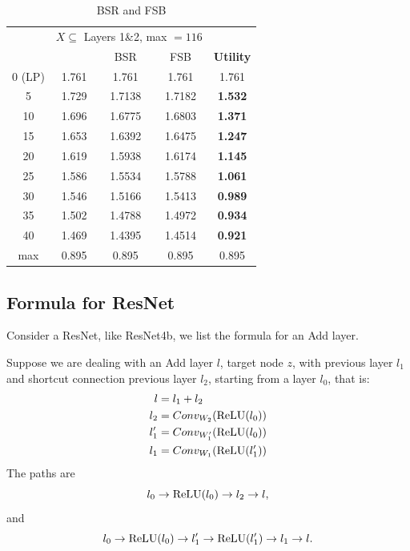 \begin{table}[h!]	
	\centering
	\begin{tabular}{|c||c|c|c|c|}
		\hline
		&\multicolumn{3}{c|}{$X \subseteq$ Layers 1\&2, max $=116$}\\\cline{2-5}
		\text{$|X|$} & \text{Random} &BSR &FSB &\bf Utility\\ \hline
		0  (LP) & 1.761  &  1.761& 1.761&1.761\\ \hline \hline
		5  & 1.729& 1.7138 & 1.7182 &\bf 1.532 \\ \hline
		10  & 1.696 & 1.6775&  1.6803&\bf  1.371\\ \hline
		15  &   1.653& 1.6392& 1.6475&\bf  1.247\\ \hline
		20  &   1.619 &1.5938 & 1.6174&\bf  1.145\\ \hline
		25  &    1.586 &1.5534 &1.5788 &\bf 1.061\\ \hline
		30  &  1.546 & 1.5166& 1.5413&\bf  0.989 \\ \hline
		35  &   1.502 & 1.4788 &1.4972 &\bf 0.934 \\ \hline
		40  &  1.469 & 1.4395& 1.4514&\bf 0.921 \\ \hline \hline
		max &  0.895 & 0.895 &0.895 &0.895   \\ \hline
	\end{tabular}
	\caption{BSR and FSB}
	\label{BSRandFSB}
\end{table}








\subsection*{Formula for ResNet}

Consider a ResNet, like ResNet4b, we list the formula for an Add layer.

Suppose we are dealing with an Add layer $l$, target node $z$, with previous layer $l_1$ and shortcut connection previous layer $l_2$, starting from a layer $l_0$, that is:
\begin{align*}
	l &= l_1+l_2\\
	l_2 &= Conv_{W_2}(\mathrm{ReLU}(l_0))\\
	l_1' &= Conv_{W'_1}(\mathrm{ReLU}(l_0))\\
	l_1 &= Conv_{W_1}(\mathrm{ReLU}(l'_{1}))
\end{align*}The paths are $$l_0\rightarrow \mathrm{ReLU}(l_0)\rightarrow l_2\rightarrow l,$$ and $$l_0\rightarrow \mathrm{ReLU}(l_0)\rightarrow l'_1\rightarrow \mathrm{ReLU}(l_1')\rightarrow l_1\rightarrow l.$$


